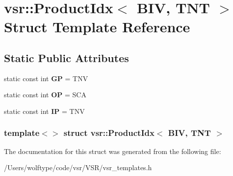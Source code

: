 \hypertarget{structvsr_1_1_product_idx_3_01_b_i_v_00_01_t_n_t_01_4}{\section{vsr\-:\-:Product\-Idx$<$ B\-I\-V, T\-N\-T $>$ Struct Template Reference}
\label{structvsr_1_1_product_idx_3_01_b_i_v_00_01_t_n_t_01_4}
}
\subsection*{Static Public Attributes}
\begin{DoxyCompactItemize}
\item 
\hypertarget{structvsr_1_1_product_idx_3_01_b_i_v_00_01_t_n_t_01_4_a93c8183963d9929133d5b1c0b2d93fc3}{static const int {\bfseries G\-P} = T\-N\-V}\label{structvsr_1_1_product_idx_3_01_b_i_v_00_01_t_n_t_01_4_a93c8183963d9929133d5b1c0b2d93fc3}

\item 
\hypertarget{structvsr_1_1_product_idx_3_01_b_i_v_00_01_t_n_t_01_4_a2066b7eee59eba63f7dee9e9e55ac8ad}{static const int {\bfseries O\-P} = S\-C\-A}\label{structvsr_1_1_product_idx_3_01_b_i_v_00_01_t_n_t_01_4_a2066b7eee59eba63f7dee9e9e55ac8ad}

\item 
\hypertarget{structvsr_1_1_product_idx_3_01_b_i_v_00_01_t_n_t_01_4_add3a608e62460aed6292f788c2cd0814}{static const int {\bfseries I\-P} = T\-N\-V}\label{structvsr_1_1_product_idx_3_01_b_i_v_00_01_t_n_t_01_4_add3a608e62460aed6292f788c2cd0814}

\end{DoxyCompactItemize}
\subsubsection*{template$<$$>$ struct vsr\-::\-Product\-Idx$<$ B\-I\-V, T\-N\-T $>$}



The documentation for this struct was generated from the following file\-:\begin{DoxyCompactItemize}
\item 
/\-Users/wolftype/code/vsr/\-V\-S\-R/vsr\-\_\-templates.\-h\end{DoxyCompactItemize}
